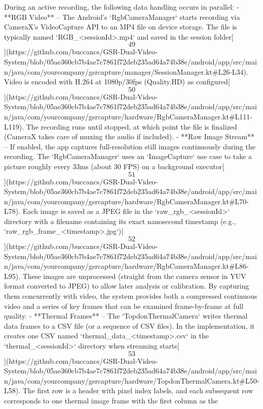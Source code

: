 \documentclass[12pt,a4paper]{article}
\begin{document}
{During an active recording, the following data handling occurs in
parallel: - **RGB Video** -- The Android's `RgbCameraManager` starts
recording via CameraX's VideoCapture API to an MP4 file on device
storage. The file is typically named `RGB_<sessionId>.mp4` and saved in
the session
folder[\[49\]](https://github.com/buccancs/GSR-Dual-Video-System/blob/05ae360cb7b4ae7c7861f72deb235ad64a74b38e/android/app/src/main/java/com/yourcompany/gsrcapture/manager/SessionManager.kt#L26-L34).
Video is encoded with H.264 at 1080p/30fps (Quality.HD) as
configured[\[50\]](https://github.com/buccancs/GSR-Dual-Video-System/blob/05ae360cb7b4ae7c7861f72deb235ad64a74b38e/android/app/src/main/java/com/yourcompany/gsrcapture/hardware/RgbCameraManager.kt#L111-L119).
The recording runs until stopped, at which point the file is finalized
(CameraX takes care of muxing the audio if included). - **Raw Image
Stream** -- If enabled, the app captures full-resolution still images
continuously during the recording. The `RgbCameraManager` uses an
`ImageCapture` use case to take a picture roughly every 33ms (about 30
FPS) on a background
executor[\[51\]](https://github.com/buccancs/GSR-Dual-Video-System/blob/05ae360cb7b4ae7c7861f72deb235ad64a74b38e/android/app/src/main/java/com/yourcompany/gsrcapture/hardware/RgbCameraManager.kt#L70-L78).
Each image is saved as a JPEG file in the `raw_rgb_<sessionId>`
directory with a filename containing its exact nanosecond timestamp
(e.g.,
`raw_rgb_frame_<timestamp>.jpg`)[\[52\]](https://github.com/buccancs/GSR-Dual-Video-System/blob/05ae360cb7b4ae7c7861f72deb235ad64a74b38e/android/app/src/main/java/com/yourcompany/gsrcapture/hardware/RgbCameraManager.kt#L86-L95).
These images are unprocessed (straight from the camera sensor in YUV
format converted to JPEG) to allow later analysis or calibration. By
capturing them concurrently with video, the system provides both a
compressed continuous video and a series of key frames that can be
examined frame-by-frame at full quality. - **Thermal Frames** -- The
`TopdonThermalCamera` writes thermal data frames to a CSV file (or a
sequence of CSV files). In the implementation, it creates one CSV named
`thermal_data_<timestamp>.csv` in the `thermal_<sessionId>` directory
when streaming
starts[\[53\]](https://github.com/buccancs/GSR-Dual-Video-System/blob/05ae360cb7b4ae7c7861f72deb235ad64a74b38e/android/app/src/main/java/com/yourcompany/gsrcapture/hardware/TopdonThermalCamera.kt#L50-L58).
The first row is a header with pixel index labels, and each subsequent
row corresponds to one thermal image frame with the first column as the
}
\end{document}
